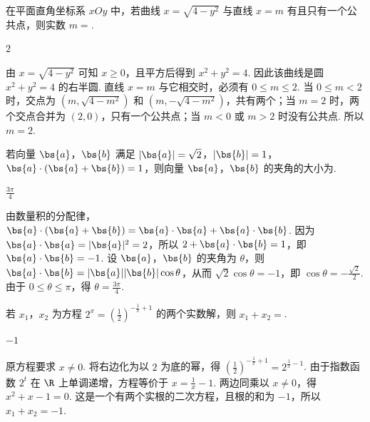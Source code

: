 \begin{problem}
在平面直角坐标系 \(xOy\) 中，若曲线 \(x=\sqrt{4-y^2}\) 与直线 \(x=m\) 有且只有一个公共点，则实数 \(m=\)\fillinblank{}.
\end{problem}

\begin{answer}
\(2\)
\end{answer}

\begin{solution}
由 \(x=\sqrt{4-y^2}\) 可知 \(x\geqslant0\)，且平方后得到 \(x^2+y^2=4\). 因此该曲线是圆 \(x^2+y^2=4\) 的右半圆. 直线 \(x=m\) 与它相交时，必须有 \(0\leqslant m\leqslant2\). 当 \(0\leqslant m<2\) 时，交点为 \(\left(m,\sqrt{4-m^2}\right)\) 和 \(\left(m,-\sqrt{4-m^2}\right)\)，共有两个；当 \(m=2\) 时，两个交点合并为 \((2,0)\)，只有一个公共点；当 \(m<0\) 或 \(m>2\) 时没有公共点. 所以 \(m=2\).
\end{solution}

\begin{problem}
若向量 \(\bs{a}\)，\(\bs{b}\) 满足 \(|\bs{a}|=\sqrt{2}\)，\(|\bs{b}|=1\)，\(\bs{a}\cdot(\bs{a}+\bs{b})=1\)，则向量 \(\bs{a}\)，\(\bs{b}\) 的夹角的大小为\fillinblank{}.
\end{problem}

\begin{answer}
\(\frac{3\pi}{4}\)
\end{answer}

\begin{solution}
由数量积的分配律，\(\bs{a}\cdot(\bs{a}+\bs{b})=\bs{a}\cdot\bs{a}+\bs{a}\cdot\bs{b}\). 因为 \(\bs{a}\cdot\bs{a}=|\bs{a}|^2=2\)，所以 \(2+\bs{a}\cdot\bs{b}=1\)，即 \(\bs{a}\cdot\bs{b}=-1\). 设 \(\bs{a}\)，\(\bs{b}\) 的夹角为 \(\theta\)，则 \(\bs{a}\cdot\bs{b}=|\bs{a}||\bs{b}|\cos\theta\)，从而 \(\sqrt{2}\cos\theta=-1\)，即 \(\cos\theta=-\frac{\sqrt{2}}{2}\). 由于 \(0\leqslant\theta\leqslant\pi\)，得 \(\theta=\frac{3\pi}{4}\).
\end{solution}

\begin{problem}
若 \(x_1\)，\(x_2\) 为方程 \(2^x=\left(\frac{1}{2}\right)^{-\frac{1}{x}+1}\) 的两个实数解，则 \(x_1+x_2=\)\fillinblank{}.
\end{problem}

\begin{answer}
\(-1\)
\end{answer}

\begin{solution}
原方程要求 \(x\neq0\). 将右边化为以 \(2\) 为底的幂，得 \(\left(\frac12\right)^{-\frac1x+1}=2^{\frac1x-1}\). 由于指数函数 \(2^t\) 在 \(\R\) 上单调递增，方程等价于 \(x=\frac1x-1\). 两边同乘以 \(x\neq0\)，得 \(x^2+x-1=0\). 这是一个有两个实根的二次方程，且根的和为 \(-1\)，所以 \(x_1+x_2=-1\).
\end{solution}


